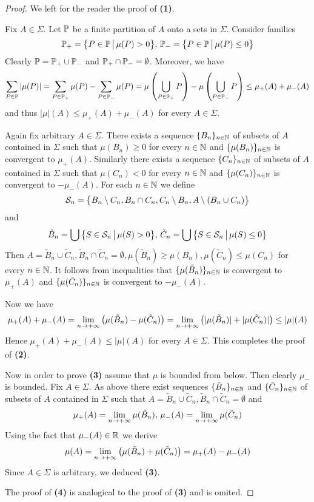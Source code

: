 \begin{proof}
    We left for the reader the proof of \textbf{(1)}.

    Fix $A \in \Sigma$. Let ${\mathbb P}$ be a finite partition of $A$ onto a sets in $\Sigma$. Consider families
    $${\mathbb P}_+ = \big\{P\in {\mathbb P}\,\big|\,\mu(P) > 0\big\},\,{\mathbb P}_- = \big\{P\in {\mathbb P}\,\big|\,\mu(P) \leq 0\big\}$$
    Clearly ${\mathbb P} = {\mathbb P}_+ \cup {\mathbb P}_-$ and ${\mathbb P}_+ \cap {\mathbb P}_- = \emptyset$. Moreover, we have
    $$\sum_{P\in {\mathbb P}}|\mu(P)| = \sum_{P \in {\mathbb P}_+}\mu(P) - \sum_{P \in {\mathbb P}_-}\mu(P) = \mu\left(\bigcup_{P\in {\mathbb P}_+}P\right) - \mu\left(\bigcup_{P\in {\mathbb P}_-}P\right) \leq \mu_+(A) + \mu_-(A)$$
    and thus $|\mu|(A) \leq \mu_+(A) + \mu_-(A)$ for every $A \in \Sigma$.

    Again fix arbitrary $A \in \Sigma$. There exists a sequence $\{B_n\}_{n\in {\mathbb N}}$ of subsets of $A$ contained in $\Sigma$ such that $\mu(B_n) \geq 0$ for every $n\in {\mathbb N}$ and $\{\mu(B_n)\}_{n\in {\mathbb N}}$ is convergent to $\mu_+(A)$. Similarly there exists a sequence $\{C_n\}_{n\in {\mathbb N}}$ of subsets of $A$ contained in $\Sigma$ such that $\mu(C_n) < 0$ for every $n \in {\mathbb N}$ and $\{\mu(C_n)\}_{n\in {\mathbb N}}$ is convergent to $-\mu_-(A)$. For each $n\in {\mathbb N}$ we define
    $${\mathcal S}_n = \big\{B_n\setminus C_n,B_n \cap C_n,C_n \setminus B_n, A \setminus (B_n\cup C_n) \big\}$$
    and
    $$\tilde{B}_n = \bigcup\big\{S\in {\mathcal S}_n\,\big|\,\mu(S) > 0\big\},\,\tilde{C}_n = \bigcup\big\{S\in {\mathcal S}_n\,\big|\,\mu(S) \leq 0\big\}$$
    Then $A = \tilde{B}_n\cup \tilde{C}_n,\tilde{B}_n\cap \tilde{C}_n = \emptyset,\mu(\tilde{B}_n) \geq \mu(B_n),\mu(\tilde{C}_n) \leq \mu(C_n)$ for every $n \in {\mathbb N}$. It follows from inequalities that $\{\mu(\tilde{B}_n)\}_{n\in {\mathbb N}}$ is convergent to $\mu_+(A)$ and $\{\mu(\tilde{C}_n)\}_{n\in {\mathbb N}}$ is convergent to $-\mu_-(A)$.

    Now we have
    $$\mu_+(A) + \mu_-(A) = \lim_{n\rightarrow +\infty}\left(\mu(\tilde{B}_n) - \mu(\tilde{C}_n)\right) = \lim_{n\rightarrow +\infty}\left(|\mu(\tilde{B}_n)| + |\mu(\tilde{C}_n)|\right) \leq |\mu|(A)$$
    Hence $\mu_+(A) + \mu_-(A) \leq |\mu|(A)$ for every $A \in \Sigma$. This completes the proof of \textbf{(2)}.

    Now in order to prove \textbf{(3)} assume that $\mu$ is bounded from below. Then clearly $\mu_-$ is bounded. Fix $A \in \Sigma$. As above there exist sequences $\{\tilde{B}_n\}_{n\in {\mathbb N}}$ and $\{\tilde{C}_n\}_{n\in {\mathbb N}}$ of subsets of $A$ contained in $\Sigma$ such that $A = \tilde{B}_n\cup \tilde{C}_n,\tilde{B}_n\cap \tilde{C}_n = \emptyset$ and
    $$\mu_+(A) = \lim_{n\rightarrow +\infty} \mu(\tilde{B}_n),\,\mu_-(A) = \lim_{n\rightarrow +\infty}\mu(\tilde{C}_n)$$
    Using the fact that $\mu_-(A) \in {\mathbb R}$ we derive
    $$\mu(A) = \lim_{n\rightarrow +\infty}\left(\mu(\tilde{B}_n) + \mu(\tilde{C}_n)\right) = \mu_+(A) - \mu_-(A)$$
    Since $A \in \Sigma$ is arbitrary, we deduced \textbf{(3)}.

    The proof of \textbf{(4)} is analogical to the proof of \textbf{(3)} and is omited.
\end{proof}

